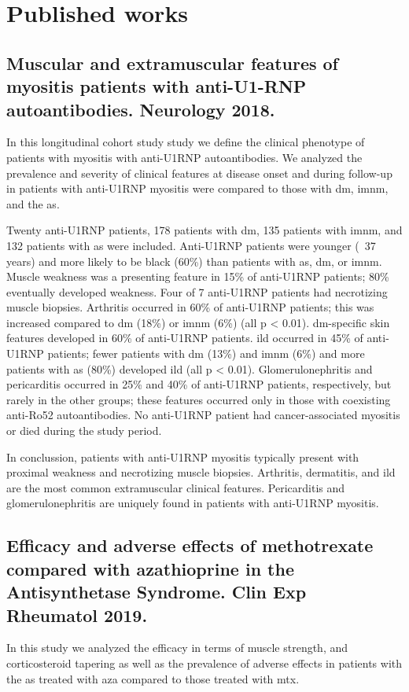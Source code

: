 \appendix
\chapter{Published works}
\label{chap:appendix}

\section{Muscular and extramuscular features of myositis patients with anti-U1-RNP autoantibodies. Neurology 2018.}
\label{sec:u1rnp}
In this longitudinal cohort study study we define the clinical phenotype of patients with myositis with anti-U1RNP autoantibodies. We analyzed the prevalence and severity of clinical features at disease onset and during follow-up in patients with anti-U1RNP myositis were compared to those with \gls{dm}, \gls{imnm}, and the \gls{as}.

Twenty anti-U1RNP patients, 178 patients with \gls{dm}, 135 patients with \gls{imnm}, and 132 patients with \gls{as} were included. Anti-U1RNP patients were younger (~37 years) and more likely to be black (60\%) than patients with \gls{as}, \gls{dm}, or \gls{imnm}. Muscle weakness was a presenting feature in 15\% of anti-U1RNP patients; 80\% eventually developed weakness. Four of 7 anti-U1RNP patients had necrotizing muscle biopsies. Arthritis occurred in 60\% of anti-U1RNP patients; this was increased compared to \gls{dm} (18\%) or \gls{imnm} (6\%) (all p < 0.01). \gls{dm}-specific skin features developed in 60\% of anti-U1RNP patients. \gls{ild} occurred in 45\% of anti-U1RNP patients; fewer patients with \gls{dm} (13\%) and \gls{imnm} (6\%) and more patients with \gls{as} (80\%) developed \gls{ild} (all p < 0.01). Glomerulonephritis and pericarditis occurred in 25\% and 40\% of anti-U1RNP patients, respectively, but rarely in the other groups; these features occurred only in those with coexisting anti-Ro52 autoantibodies. No anti-U1RNP patient had cancer-associated myositis or died during the study period.

In conclussion, patients with anti-U1RNP myositis typically present with proximal weakness and necrotizing muscle biopsies. Arthritis, dermatitis, and \gls{ild} are the most common extramuscular clinical features. Pericarditis and glomerulonephritis are uniquely found in patients with anti-U1RNP myositis.



\section{Efficacy and adverse effects of methotrexate compared with azathioprine in the Antisynthetase Syndrome. Clin Exp Rheumatol 2019.}
\label{sec:mtx_aza}
In this study we analyzed the efficacy in terms of muscle strength, and corticosteroid tapering as well as the prevalence of adverse effects in patients with the \gls{as} treated with \gls{aza} compared to those treated with \gls{mtx}.

